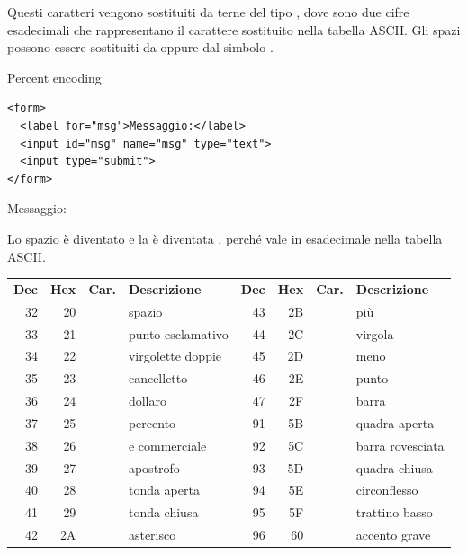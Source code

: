 Questi caratteri vengono sostituiti da terne del tipo , dove
 sono due cifre esadecimali che rappresentano il carattere sostituito
nella tabella ASCII. Gli spazi possono essere sostituiti da  oppure
dal simbolo \code{+}.

\begin{esempio}{Percent encoding}
\begin{affianco}[0.5]
\begin{lstlisting}[style=html, name=encoding.html]
<form>
  <label for="msg">Messaggio:</label>
  <input id="msg" name="msg" type="text">
  <input type="submit">
</form>
\end{lstlisting}
\risultato
\begin{browser}
  Messaggio:  
\end{browser}
\end{affianco}

Lo spazio è diventato \code{+} e la \code{\&} è diventata , perché
\code{\&} vale  in esadecimale nella tabella ASCII.
\end{esempio}

\begin{center}
\renewcommand{\arraystretch}{1.2}
{\small
\begin{tabular}{@{}rrcl@{\hspace{1.2cm}}rrcl@{}}
  \textbf{Dec} & \textbf{Hex} & \textbf{Car.} & \textbf{Descrizione} &
  \textbf{Dec} & \textbf{Hex} & \textbf{Car.} & \textbf{Descrizione} \\
  32 & 20 &           & spazio              & 43 & 2B & \code{+} & più \\
  33 & 21 & \code{!}  & punto esclamativo   & 44 & 2C & \code{,} & virgola \\
  34 & 22 & \code{"}  & virgolette doppie   & 45 & 2D & \code{-} & meno \\
  35 & 23 & \code{\#} & cancelletto         & 46 & 2E & \code{.} & punto \\
  36 & 24 & \code{\$} & dollaro             & 47 & 2F & \code{/} & barra \\
  37 & 25 & \code{\%} & percento            & 91 & 5B & \code{[} & quadra aperta \\
  38 & 26 & \code{\&} & e commerciale       & 92 & 5C & \code{\textbackslash} & barra rovesciata \\
  39 & 27 & \code{'}  & apostrofo           & 93 & 5D & \code{]} & quadra chiusa \\
  40 & 28 & \code{(}  & tonda aperta        & 94 & 5E & \code{\textasciicircum} & circonflesso \\
  41 & 29 & \code{)}  & tonda chiusa        & 95 & 5F & \code{\_} & trattino basso \\
  42 & 2A & \code{*}  & asterisco           & 96 & 60 & \code{`} & accento grave \\
\end{tabular}}
\end{center}

